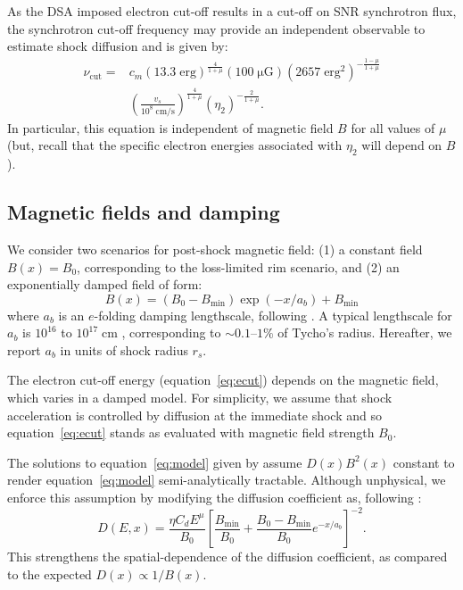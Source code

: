 \documentclass[manuscript]{aastex}  %
\newcommand*{\mt}{\mathrm}
\newcommand*{\unit}[1]{\;\mt{#1}}  %
\newcommand*{\abt}{\mathord{\sim}} %
\newcommand*{\Bmin}{B_{\mt{min}}}
\newcommand*{\muG}{\unit{\mu G}}
\begin{document}
As the DSA imposed electron cut-off results in a cut-off on SNR synchrotron
flux, the synchrotron cut-off frequency may provide an independent observable
to estimate shock diffusion and is given by:
\begin{align} \label{eq:cutoff}
    \nu_{\mt{cut}} =
        &c_m \left(13.3 \unit{erg}\right)^{\frac{4}{1+\mu}}
        \left(100 \muG\right)
        \left(2657 \unit{erg^2}\right)^{-\frac{1-\mu}{1+\mu}} \nonumber \\
        &\left( \frac{v_s}{10^8 \unit{cm/s}} \right)^{\frac{4}{1+\mu}}
        \left( \eta_2 \right)^{-\frac{2}{1+\mu}} .
\end{align}
In particular, this equation is independent of magnetic field $B$ for all
values of $\mu$ (but, recall that the specific electron energies associated
with $\eta_2$ will depend on $B$).

\subsection{Magnetic fields and damping}

We consider two scenarios for post-shock magnetic field: (1) a constant field
$B(x) = B_0$, corresponding to the loss-limited rim scenario, and (2) an
exponentially damped field of form:
\begin{equation} \label{eq:bdamp}
    B(x) = \left(B_0 - \Bmin\right) \exp\left(-x / a_b\right)
           + \Bmin
\end{equation}
where $a_b$ is an $e$-folding damping lengthscale, following \citet{pohl2005}.
A typical lengthscale for $a_b$ is $10^{16}$ to $10^{17} \unit{cm}$
\citep{pohl2005}, corresponding to $\abt 0.1$--$1\%$ of Tycho's radius.
Hereafter, we report $a_b$ in units of shock radius $r_s$.

The electron cut-off energy (equation~\eqref{eq:ecut}) depends on the magnetic
field, which varies in a damped model.  For simplicity, we assume that shock
acceleration is controlled by diffusion at the immediate shock and so
equation~\eqref{eq:ecut} stands as evaluated with magnetic field strength
$B_0$.

The solutions to equation~\eqref{eq:model} given by \citet{lerche1980} assume
$D(x) B^2(x)$ constant to render equation~\eqref{eq:model} semi-analytically
tractable.  Although unphysical, we enforce this assumption by modifying the
diffusion coefficient as, following \citet{rettig2012}:
\begin{equation} \label{eq:ddamp}
    D(E,x) = \frac{\eta C_d E^\mu}{B_0}
             \left[ \frac{\Bmin}{B_0} +
                    \frac{B_0 - \Bmin}{B_0} e^{-x/a_b} \right]^{-2} .
\end{equation}
This strengthens the spatial-dependence of the diffusion coefficient, as
compared to the expected $D(x) \propto 1/B(x)$.
\end{document}
